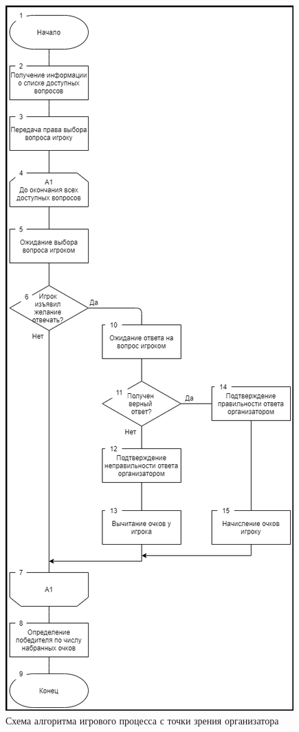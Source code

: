 \begin{figure}
\centering
	\includegraphics[scale=0.7]{attachments/game_organizer_alg.png}
	\caption{Схема алгоритма игрового процесса с точки зрения организатора}
	\label{fig:domain:model:game:organizer_alg}
\end{figure}

